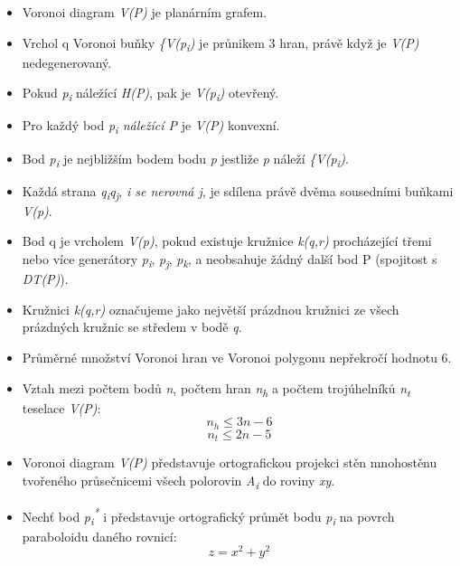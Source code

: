 \begin{itemize}
\item Voronoi diagram \textit{V(P)} je planárním grafem.
\item Vrchol q Voronoi buňky \textit{\{V(p\textsubscript{i})} je průnikem 3 hran, právě když je \textit{V(P)} nedegenerovaný.
\item Pokud \textit{p\textsubscript{i}} náležící \textit{H(P)}, pak je \textit{V(p\textsubscript{i})}  otevřený. 
\item Pro každý bod \textit{p\textsubscript{i} náležící P} je \textit{V(P)} konvexní. 
\item Bod \textit{p\textsubscript{i}} je nejbližším bodem bodu \textit{p}
jestliže \textit{p} náleží \textit{\{V(p\textsubscript{i})}.
\item Každá strana \textit{q\textsubscript{i}q\textsubscript{j}}, \textit{i se nerovná j},
je sdílena právě dvěma sousedními buňkami \textit{V(p)}. 
\item Bod q je vrcholem \textit{V(p)}, pokud existuje kružnice \textit{k(q,r)} procházející třemi
nebo více generátory \textit{p\textsubscript{i}}, \textit{p\textsubscript{j}},
\textit{p\textsubscript{k}}, a neobsahuje žádný další bod P (spojitost s \textit{DT(P)}). 
\item Kružnici \textit{k(q,r)} označujeme jako největší prázdnou kružnici ze všech prázdných kružnic se středem v bodě \textit{q}. 
\item Průměrné množství Voronoi hran ve Voronoi polygonu nepřekročí hodnotu 6. 
\item Vztah mezi počtem bodů \textit{n}, počtem hran \textit{n\textsubscript{h}}
a počtem trojúhelníků \textit{n\textsubscript{t}} teselace \textit{V(P)}:
\[ n_h \leq 3n-6\]
\[ n_t \leq 2n−5\]
\item Voronoi diagram \textit{V(P)} představuje ortografickou projekci stěn
mnohostěnu tvořeného průsečnicemi všech polorovin \textit{A\textsubscript{i}} do roviny \textit{xy}. 
\item Nechť bod \textit{p\textsubscript{i}\textsuperscript{*}} i představuje
ortografický průmět bodu \textit{p\textsubscript{i}} na povrch paraboloidu daného rovnicí:
\[ z = x^2 + y^2 \]
   
\end{itemize} 

